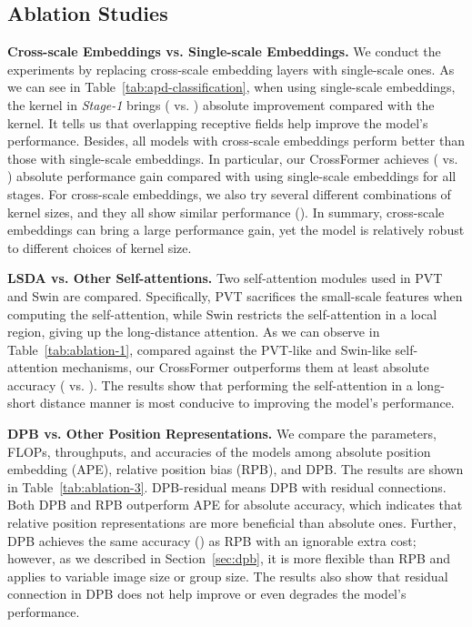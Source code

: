 \documentclass{article} \usepackage{iclr2022_conference,times}
\begin{document}
\vspace{-2mm}
\subsection{Ablation Studies}
\vspace{-1mm}

\textbf{Cross-scale Embeddings vs. Single-scale Embeddings.} We conduct the experiments by replacing cross-scale embedding layers with single-scale ones.
As we can see in Table~\ref{tab:apd-classification}, when using single-scale embeddings, the  kernel in \textit{Stage-1} brings  ( vs. ) absolute improvement compared with the  kernel. It tells us that overlapping receptive fields help improve the model's performance. Besides, all models with cross-scale embeddings perform better than those with single-scale embeddings. In particular, our CrossFormer achieves  ( vs. ) absolute performance gain compared with using single-scale embeddings for all stages. For cross-scale embeddings, we also try several different combinations of kernel sizes, and they all show similar performance (). In summary, cross-scale embeddings can bring a large performance gain, yet the model is relatively robust to different choices of kernel size.

\textbf{LSDA vs. Other Self-attentions.} Two self-attention modules used in PVT and Swin are compared. Specifically, PVT sacrifices the small-scale features when computing the self-attention, while Swin restricts the self-attention in a local region, giving up the long-distance attention. As we can observe in Table~\ref{tab:ablation-1}, compared against the PVT-like and Swin-like self-attention mechanisms, our CrossFormer outperforms them at least absolute  accuracy ( vs. ). The results show that performing the self-attention in a long-short distance manner is most conducive to improving the model's performance.

\textbf{DPB vs. Other Position Representations.} We compare the parameters, FLOPs, throughputs, and accuracies of the models among absolute position embedding (APE), relative position bias (RPB), and DPB. The results are shown in Table~\ref{tab:ablation-3}. DPB-residual means DPB with residual connections. Both DPB and RPB outperform APE for absolute  accuracy, which indicates that relative position representations are more beneficial than absolute ones.
Further, DPB achieves the same accuracy () as RPB with an ignorable extra cost; however, as we described in Section~\ref{sec:dpb}, it is more flexible than RPB and applies to variable image size or group size.
The results also show that residual connection in DPB does not help improve or even degrades the model's performance.
\end{document}
